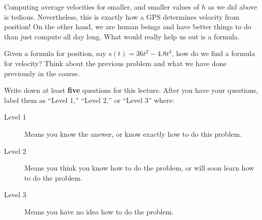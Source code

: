\documentclass{ximera}
\begin{document}
Computing average velocities for smaller, and smaller values of $h$ as
we did above is tedious. Nevertheless, this is exactly how a GPS
determines velocity from position! On the other hand, we are human
beings and have better things to do than just compute all day
long. What would really help us out is a formula.

\begin{problem}
  Given a formula for position, say $s(t) = 36t^2 -4.8t^3$, how do we
  find a formula for velocity?  Think about the previous problem and
  what we have done previously in the course.
  \begin{freeResponse}
  \end{freeResponse} 
\end{problem}

\begin{xarmaBoost}
  Write down at least \textbf{five} questions for this lecture. After
you have your questions, label them as ``Level 1,'' ``Level 2,'' or ``Level 3'' where:
\begin{description}
\item[Level 1] Means you know the answer, or know exactly how to do
  this problem.
\item[Level 2] Means you think you know how to do the problem, or will
  soon learn how to do the problem.
\item[Level 3] Means you have no idea how to do the problem.
\end{description}
\begin{freeResponse}
\end{freeResponse}
\end{xarmaBoost}
\end{document}
